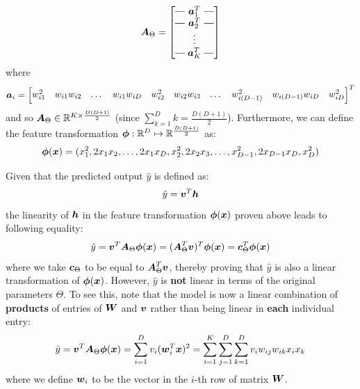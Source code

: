 \begin{questions}
        \begin{equation*}
            \vb*{A}_{\Theta} = 
            \brows{\vb*{a}_1^T \\ \vb*{a}_2^T \\ \rowsvdots \\ \vb*{a}_K^T}
        \end{equation*}
        where
        \begin{equation*}
            \vb*{a}_i = 
            \begin{bmatrix}
            w_{i1}^2 & w_{i1}w_{i2} & \dots & w_{i1}w_{iD} & w_{i2}^2 & w_{i2}w_{i3} & \dots & w_{i(D - 1)}^2  & w_{i(D - 1)} w_{iD} &  w_{iD}^2
            \end{bmatrix}^T
        \end{equation*}
        and so $\vb*{A}_{\Theta} \in \mathbb{R}^{K \times \frac{D(D + 1)}{2}}$ (since $\sum_{k = 1}^{D} k = \frac{D(D + 1)}{2}$). Furthermore, we can define the feature transformation $\vb*{\phi} : \mathbb{R}^D \mapsto  \mathbb{R}^{\frac{D(D + 1)}{2}}$ as:
        \begin{equation*}
            \vb*{\phi}(\vb*{x}) = (x_1^2, 2x_1 x_2, \dots, 2x_1 x_D, x_2^2, 2x_2 x_3, \dots, x_{D - 1}^2, 2x_{D - 1} x_{D}, x_{D}^2)
        \end{equation*}

        \question
        Given that the predicted output $\hat{y}$ is defined as:
        \[
            \hat{y} = \vb*{v}^T \vb*{h}
        \]
        the linearity of $\vb*{h}$ in the feature transformation $\vb*{\phi}(\vb*{x})$ proven above leads to following equality:
        \[
            \hat{y} = \vb*{v}^T \vb*{A}_{\Theta} \vb*{\phi}(\vb*{x}) 
                    = (\vb*{A}_{\Theta}^T \vb*{v})^T \vb*{\phi}(\vb*{x}) 
                    = \vb*{c}_{\Theta}^T \vb*{\phi}(\vb*{x}) 
        \]
        where we take $\vb*{c}_{\Theta}$ to be equal to $\vb*{A}_{\Theta}^T \vb*{v}$, thereby proving that $\hat{y}$ is also a linear transformation of $\vb*{\phi}(\vb*{x})$. However, $\hat{y}$ is \textbf{not} linear in terms of the original parameters $\Theta$. To see this, note that the model is now a linear combination of \textbf{products} of entries of $\vb*{W}$ and $\vb*{v}$ rather than being linear in \textbf{each} individual entry:
        \[
            \hat{y} = \vb*{v}^T \vb*{A}_{\Theta} \vb*{\phi}(\vb*{x}) = \sum_{i = 1}^{D} v_i (\vb*{w}_i^T \vb*{x})^2 
            = \sum_{i = 1}^{K} \sum_{j = 1}^{D} \sum_{k = 1}^{D} v_i w_{ij} w_{ik} x_i x_k
        \]
        where we define $\vb*{w}_i$ to be the vector in the $i$-th row of matrix $\vb*{W}$.


\end{questions}
